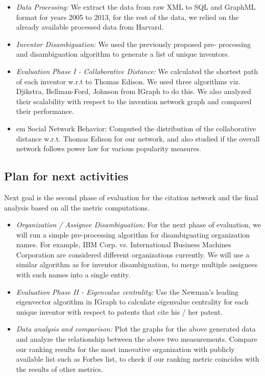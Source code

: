 	\begin{itemize}

		\item {\em Data Processing:} We extract the data from raw XML to SQL and
		GraphML format for years 2005 to 2013, for the rest of the data, we relied on
		the already available processed data from Harvard.

		\item {\em Inventor Disambiguation:} We used the previously proposed pre-
		processing and disambiguation algorithm to generate a list of unique
		inventors.

		\item {\em Evaluation Phase I - Collaborative Distance:} We calculated the 
		shortest path of each inventor w.r.t to Thomas Edison. We used three
		algorithms viz. Djikstra, Bellman-Ford, Johnson from IGraph to do this. We
		also analyzed their scalability with respect to the invention network graph
		and compared their performance.

		\item {em Social Network Behavior:} Computed the distribution of the 
		collaborative distance w.r.t. Thomas Edison for our network, and also studied
		if the overall network follows power law for various popularity measures.

	\end{itemize}

\subsection{Plan for next activities}
 
Next goal is the second phase of evaluation for the citation network and the
final analysis based on all the metric computations.

	\begin{itemize}

		\item {\em Organization / Assignee Disambiguation:} For the next phase of
		evaluation, we will run a simple pre-processing algorithm for disambiguating
		organization names. For example, IBM Corp. vs. International Business Machines
		Corporation are considered different organizations currently. We will use a
		similar algorithm as for inventor disambiguation, to merge multiple assignees
		with such names into a single entity.

		\item {\em Evaluation Phase II - Eigenvalue centrality:} Use the Newman's
		leading eigenvector algorithm in IGraph to calculate eigenvalue centrality for
		each unique inventor with respect to patents that cite his / her patent.

		\item {\em Data analysis and comparison:} Plot the graphs for the above
		generated data and analyze the relationship between the above two
		measurements. Compare our ranking results for the most innovative organization
		with publicly available list such as Forbes list, to check if our ranking
		metric coincides with the results of other metrics.

	\end{itemize}

